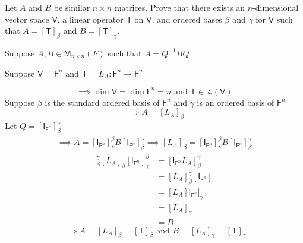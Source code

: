 Let $A$ and $B$ be similar $n \times n$ matrices. Prove that there
exists an $n$-dimensional vector space $\mathsf{V}$, a linear operator
$\mathsf{T}$ on $\mathsf{V}$, and ordered bases $\beta$ and $\gamma$
for $\mathsf{V}$ such that $A=[\mathsf{T}]_\beta$ and
$B=[\mathsf{T}]_\gamma$.

Suppose $A,B \in \mathsf{M}_{n\times n}(F)$ such that $A = Q^{-1}BQ$

Suppose $\mathsf{V}=\mathsf{F}^n$ and $\mathsf{T} = L_A\colon
\mathsf{F}^n\to\mathsf{F}^n$

\begin{equation}
\implies \dim{\mathsf{V}} = \dim{\mathsf{F}^n} = n \text{ and }
\mathsf{T} \in \mathcal{L}(\mathsf{V})
\end{equation}
Suppose $\beta$ is the standard ordered basis of $\mathsf{F}^n$ and
$\gamma$ is an ordered basis of $\mathsf{F}^n$
\begin{equation}
\implies A = [L_A]_\beta
\end{equation}
Let $Q = [\mathsf{I}_{\mathsf{F}^n}]_\beta^\gamma$
\begin{gather}
\implies A = [\mathsf{I}_{\mathsf{F}^n}]_\gamma^\beta B[\mathsf{I}_{\mathsf{F}^n}]^\gamma_\beta
\implies [L_A]_\beta = [\mathsf{I}_{\mathsf{F}^n}]_\gamma^\beta B[\mathsf{I}_{\mathsf{F}^n}]^\gamma_\beta
\end{gather}
\begin{align}
 [\mathsf{I}_{\mathsf{F}^n}]^\gamma_\beta
 [L_A]_\beta[\mathsf{I}_{\mathsf{F}^n}]_\gamma^\beta & =
 [\mathsf{I}_{\mathsf{F}^n}L_A]_\beta^\gamma\\
&= [L_A]_\beta^\gamma[\mathsf{I}_{\mathsf{F}^n}]\\
&= [L_A]\mathsf{I}_{\mathsf{F}^n}]_\gamma\\
&= [L_A]_\gamma\\
&= B
\end{align}
\begin{equation}
\implies A = [L_A]_\beta = [\mathsf{T}]_\beta \text{ and } B = [L_A]_\gamma=[\mathsf{T}]_\gamma
\end{equation}

